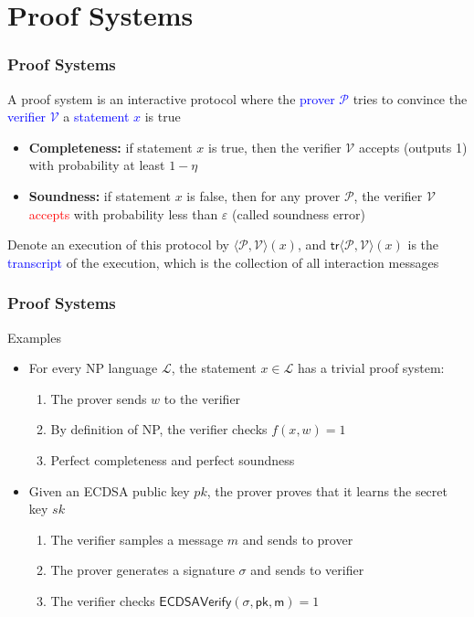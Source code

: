 \documentclass[handout]{beamer} %
\newcommand{\blue}[1]{\textcolor{blue}{#1}}
\newcommand{\dgreen}[1]{\textcolor{dgreen}{#1}}
\newcommand{\red}[1]{\textcolor{red}{#1}}
\begin{document}
\section{Proof Systems}
\frame
{
  \frametitle{Proof Systems}
  \onslide<+-> A proof system is an interactive protocol where the \blue{prover $\mathcal{P}$} tries to \dgreen{convince} the \blue{verifier $\mathcal{V}$} a \blue{statement $x$} is true
  \begin{itemize}
    \item<+-> \textbf{Completeness:} if statement $x$ is true, then the verifier $\mathcal{V}$ \dgreen{accepts} (outputs 1) with probability at least $1-\eta$
    \item<+-> \textbf{Soundness:} if statement $x$ is false, then for any prover $\mathcal{P}$, the verifier $\mathcal{V}$ \red{accepts} with probability less than $\varepsilon$ (called soundness error)
  \end{itemize}
  \onslide<+-> Denote an execution of this protocol by $\langle\mathcal{P},\mathcal{V}\rangle(x)$, and $\mathsf{tr}\langle\mathcal{P},\mathcal{V}\rangle(x)$ is the \blue{transcript} of the execution, which is the collection of all interaction messages
}

\frame
{
  \frametitle{Proof Systems}
  \onslide<+-> Examples
  \begin{itemize}
    \item<+-> For every NP language $\mathcal{L}$, the statement $x\in\mathcal{L}$ has a trivial proof system:
    \begin{enumerate}
      \item<+-> The prover sends $w$ to the verifier
      \item<+-> By definition of NP, the verifier checks $f(x,w)=1$
      \item<+-> \dgreen{Perfect completeness} and \dgreen{perfect soundness}
    \end{enumerate}
    \item<+-> Given an ECDSA public key $pk$, the prover proves that it learns the secret key $sk$
    \begin{enumerate}
      \item<+-> The verifier samples a message $m$ and sends to prover
      \item<+-> The prover generates a signature $\sigma$ and sends to verifier
      \item<+-> The verifier checks $\mathsf{ECDSAVerify(\sigma,pk,m)}=1$
    \end{enumerate}
  \end{itemize}
}
\end{document}
